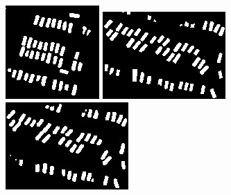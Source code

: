 \documentclass{kththesis}
\begin{document}
\begin{figure}[H]
\endminipage\hfill
{}%
  \includegraphics[width=\linewidth]{class_vs_w/weight_1}
\endminipage
\vspace{1ex}
  \includegraphics[width=\linewidth]{class_vs_w/label_2}
\endminipage\hfill
{}
  \includegraphics[width=\linewidth]{class_vs_w/un_weight_2}

\end{figure}
\end{document}
